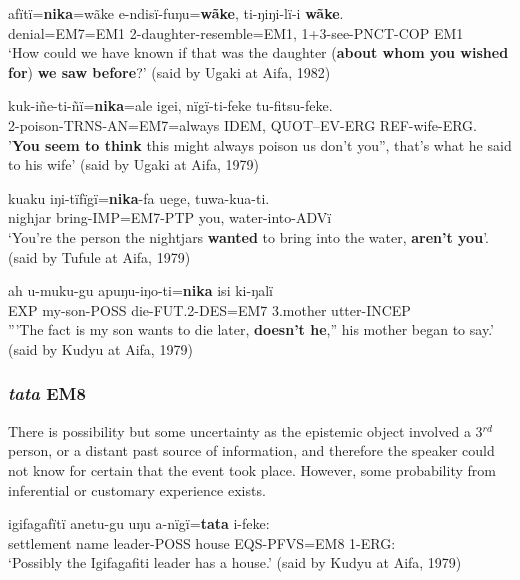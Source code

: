 \documentclass[output=paper]{langsci/langscibook}
\begin{document}
\begin{exe}
	\ex \label{ex:eb14}
	\gll afïtï=\textbf{nika}=wãke e-ndisï-fuŋu=\textbf{wãke}, ti-ŋiŋi-lï-i \textbf{wãke}.\\
	denial=EM7=EM1 2-daughter-resemble=EM1, 1+3-see-PNCT-COP EM1\\
	\trans ‘How could we have known if that was the daughter (\textbf{about whom you wished for}) \textbf{we saw before}?' (said by Ugaki at Aifa, 1982)
\end{exe}

\begin{exe}
	\ex \label{ex:eb15}
	\gll kuk-iñe-ti-ñï=\textbf{nika}=ale igei, nïgï-ti-feke tu-fitsu-feke.\\
	2-poison-TRNS-AN=EM7=always IDEM, QUOT–EV-ERG REF-wife-ERG.\\
	\trans '\textbf{You seem to think} this might always poison us don’t you”, that’s what he said to his wife' (said by Ugaki at Aifa, 1979)
\end{exe}

\begin{exe}
	\ex \label{ex:eb16}
	\gll kuaku iŋi-tïfïgï=\textbf{nika}-fa uege, tuwa-kua-ti.\\
	nighjar bring-IMP=EM7-PTP you, water-into-ADVï\\
	\trans ‘You’re the person the nightjars \textbf{wanted} to bring into the water, \textbf{aren’t you}’. (said by Tufule at Aifa, 1979)
\end{exe}

\begin{exe}
	\ex \label{ex:eb17}
	\gll ah u-muku-gu apuŋu-iŋo-ti=\textbf{nika} isi ki-ŋalï\\
	EXP my-son-POSS die-FUT.2-DES=EM7 3.mother utter-INCEP\\
	\trans '''The fact is my son wants to die later, \textbf{doesn’t he},”  his mother began to say.' (said by Kudyu at Aifa, 1979)
\end{exe}

\subsubsection{\textit{tata} EM8}
There is possibility but some uncertainty as the epistemic object involved a 3$^{rd}$ person, or a distant past source of information, and therefore the speaker could not know for certain that the event took place. However,  some probability from inferential or customary experience exists.  

\begin{exe}
	\ex \label{ex:eb18}
	\gll igifagafïtï anetu-gu uŋu a-nïgï=\textbf{tata} i-feke:\\
	{settlement name} leader-POSS house EQS-PFVS=EM8 1-ERG:\\
	\trans ‘Possibly the Igifagafiti leader has a house.’ (said by Kudyu at Aifa, 1979)
\end{exe}
\end{document}
